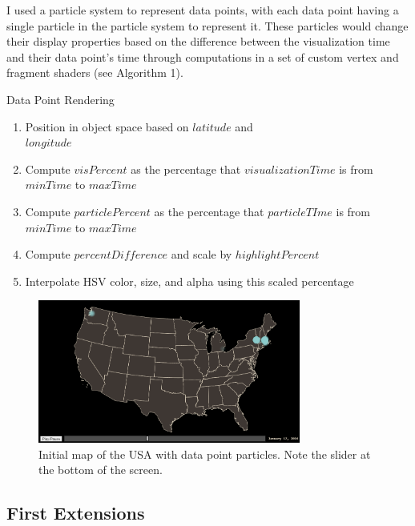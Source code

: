 \documentclass[conference]{acmsiggraph}
\begin{document}
I used a particle system to represent data points, with each data point having
a single particle in the particle system to represent it. These particles would
change their display properties based on the difference between the
visualization time and their data point's time through computations in a set
of custom vertex and fragment shaders (see Algorithm 1).

\begin{algorithm}
\DontPrintSemicolon
\caption{Data Point Rendering}
     {
        \begin{enumerate}
            \item Position in object space based on $latitude$ and \\
                $longitude$
            \item Compute $visPercent$ as the percentage that
                $visualizationTime$ is from $minTime$ to $maxTime$
            \item Compute $particlePercent$ as the percentage that
                $particleTIme$ is from $minTime$ to $maxTime$
            \item Compute $percentDifference$ and scale by $highlightPercent$
            \item Interpolate HSV color, size, and alpha using this scaled
                percentage
        \end{enumerate}
    }
\end{algorithm}

\begin{figure}[b]
  \centering
  \includegraphics[width=3.4in]{images/initial_us_map}
  \caption{Initial map of the USA with data point particles. Note the slider at
           the bottom of the screen.}
\end{figure}

\subsection{First Extensions}
\end{document}
